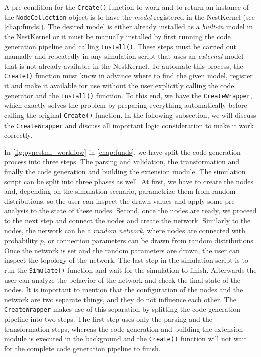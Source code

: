 A pre-condition for the \texttt{Create()} function to work and to return an instance of the \texttt{NodeCollection} object is to have the \emph{model} registered in the NestKernel (see \autoref{chap:funds}). The desired model is either already installed as a \emph{built-in} model in the NestKernel or it must be manually installed by first running the code generation pipeline and calling \texttt{Install()}. These steps must be carried out manually and repeatedly in any simulation script that uses an \emph{external} model that is not already available in the NestKernel. To automate this process, the \texttt{Create()} function must know in advance where to find the given model, register it and make it available for use without the user explicitly calling the code generator and the \texttt{Install()} function. To this end, we have the \texttt{CreateWrapper}, which exactly solves the problem by preparing everything automatically before calling the original \texttt{Create()} function. In the following subsection, we will discuss the \texttt{CreateWrapper} and discuss all important logic consideration to make it work correctly.

In \autoref{fig:pynestml_workflow} in \autoref{chap:funds}, we have split the code generation process into three steps. The parsing and validation, the transformation and finally the code generation and building the extension module. The simulation script can be split into three phases as well. At first, we have to create the nodes and, depending on the simulation scenario, parametrize them from random distributions, so the user can inspect the drawn values and apply some pre-analysis to the state of these nodes. Second, once the nodes are ready, we proceed to the next step and connect the nodes and create the network. Similarly to the nodes, the network can be a \emph{random network}, where nodes are connected with probability $p$, or connection parameters can be drawn from random distributions. Once the network is set and the random parameters are drawn, the user can inspect the topology of the network. The last step in the simulation script is to run the \texttt{Simulate()} function and wait for the simulation to finish. Afterwards the user can analyze the behavior of the network and check the final state of the nodes. It is important to mention that the configuration of the nodes and the network are two separate things, and they do not influence each other. The \texttt{CreateWrapper} makes use of this separation by splitting the code generation pipeline into two steps. The first step uses only the parsing and the transformation steps, whereas the code generation and building the extension module is executed in the background and the \texttt{Create()} function will not wait for the complete code generation pipeline to finish.

